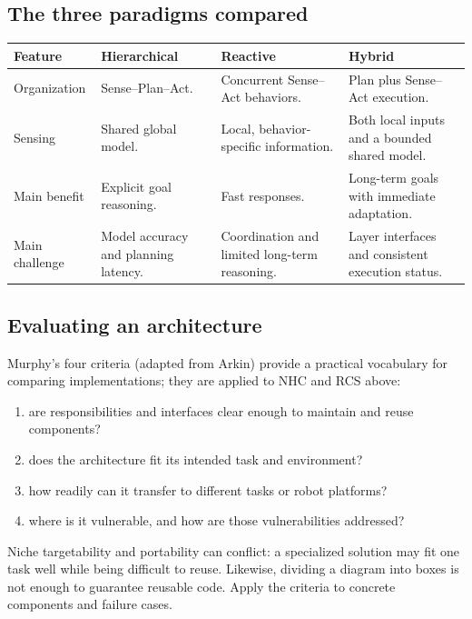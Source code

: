\subsection{The three paradigms compared}
\par\smallskip\begin{tabularx}{\linewidth}{@{}L{24mm}YYY@{}}
\toprule
Feature & Hierarchical & Reactive & Hybrid \\
\midrule
Organization & Sense--Plan--Act. & Concurrent Sense--Act behaviors. & Plan plus Sense--Act execution. \\
Sensing & Shared global model. & Local, behavior-specific information. & Both local inputs and a bounded shared model. \\
Main benefit & Explicit goal reasoning. & Fast responses. & Long-term goals with immediate adaptation. \\
Main challenge & Model accuracy and planning latency. & Coordination and limited long-term reasoning. & Layer interfaces and consistent execution status. \\
\bottomrule
\end{tabularx}\par\smallskip


\subsection{Evaluating an architecture}
Murphy's four criteria (adapted from Arkin) provide a practical vocabulary for comparing implementations; they are applied to NHC and RCS above:
\begin{enumerate}
\item {} are responsibilities and interfaces clear enough to maintain and reuse components?
\item {} does the architecture fit its intended task and environment?
\item {} how readily can it transfer to different tasks or robot platforms?
\item {} where is it vulnerable, and how are those vulnerabilities addressed?
\end{enumerate}
Niche targetability and portability can conflict: a specialized solution may fit one task well while being difficult to reuse. Likewise, dividing a diagram into boxes is not enough to guarantee reusable code. Apply the criteria to concrete components and failure cases.
